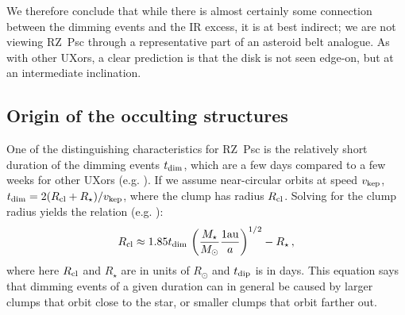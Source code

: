 \documentclass[]{rsos}
\begin{document}
We therefore conclude that while there is almost certainly some connection between the
dimming events and the IR excess, it is at best indirect; we are not viewing RZ~Psc
through a representative part of an asteroid belt analogue. As with other UXors, a clear
prediction is that the disk is not seen edge-on, but at an intermediate inclination.

\subsection{Origin of the occulting structures}\label{ss:orig}

One of the distinguishing characteristics for RZ~Psc is the relatively short duration of
the dimming events $t_{\rm dim}$, which are a few days compared to a few weeks for other
UXors (e.g. \cite{1999AJ....118.1043H,2010A&A...511L...9C}). If we assume near-circular
orbits at speed $v_{\rm kep}$, $t_{\rm dim}=2(R_{\rm cl}+R_\star)/v_{\rm kep}$, where the
clump has radius $R_{\rm cl}$. Solving for the clump radius yields the relation
(e.g. \cite{2016ApJ...816...69A,2016MNRAS.457.3988B}):
\begin{equation}
  R_{\rm cl} \approx 1.85 t_{\rm dim} \, \left( \frac{M_\star}{M_\odot} \frac{1 {\rm au}}{a} \right)^{1/2} - R_\star \, ,
\end{equation}
where here $R_{\rm cl}$ and $R_\star$ are in units of $R_\odot$ and $t_{\rm dip}$ is in
days. This equation says that dimming events of a given duration can in general be caused
by larger clumps that orbit close to the star, or smaller clumps that orbit farther out.

\end{document}
